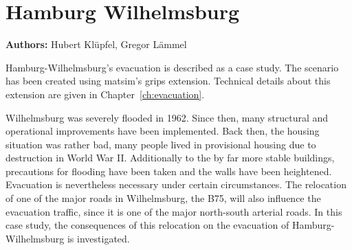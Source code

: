 \section{Hamburg Wilhelmsburg}
\label{ch:sc:hhw}
\hfill \textbf{Authors:} Hubert Klüpfel, Gregor Lämmel

Hamburg-Wilhelmsburg's evacuation is described as a case study. The scenario has been created using \gls{matsim}'s \gls{grips} \gls{extension}. Technical details about this extension are given in Chapter~\ref{ch:evacuation}. 

Wilhelmsburg was severely flooded in 1962. Since then, many structural and operational improvements have been implemented. Back then, the housing situation was rather bad, many people lived in provisional housing due to destruction in World War II. Additionally to the by far more stable buildings, precautions for flooding have been taken and the walls have been heightened. Evacuation is nevertheless necessary under certain circumstances. The relocation of one of the major roads in Wilhelmsburg, the B75, will also influence the evacuation traffic, since it is one of the major north-south arterial roads. In this case study, the consequences of this relocation on the evacuation of Hamburg-Wilhelmsburg is investigated.


